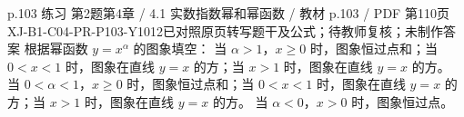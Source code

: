 \par\noindent\begin{minipage}{\linewidth}
\begin{bankitem}{p.103 练习 第2题}{第4章 / 4.1 实数指数幂和幂函数 / 教材 p.103 / PDF 第110页}{XJ-B1-C04-PR-P103-Y1012}{已对照原页转写题干及公式；待教师复核；未制作答案}
根据幂函数 $y=x^\alpha$ 的图象填空：
当 $\alpha>1$，$x\ge0$ 时，图象恒过点\blank 和\blank；当 $0<x<1$ 时，图象在直线 $y=x$ 的\blank 方；当 $x>1$ 时，图象在直线 $y=x$ 的\blank 方。
当 $0<\alpha<1$，$x\ge0$ 时，图象恒过点\blank 和\blank；当 $0<x<1$ 时，图象在直线 $y=x$ 的\blank 方；当 $x>1$ 时，图象在直线 $y=x$ 的\blank 方。
当 $\alpha<0$，$x>0$ 时，图象恒过点\blank。
\end{bankitem}
\end{minipage}\par\medskip
